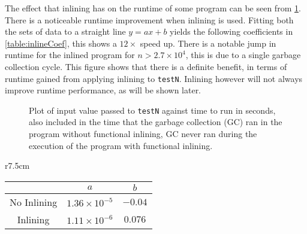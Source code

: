 \documentclass[float=false, crop=false]{standalone}
\newlength\gwidth
\newlength\gheight
\newcommand{\importMGraph}[3]{\setlength{\gwidth}{#2}\setlength{\gheight}{#3}{#1}}
\begin{document}
The effect that inlining has on the runtime of some program can be seen from
\cref{plot:inlinePlot}. 
 There is a noticeable runtime improvement when inlining is used.
Fitting both the sets of data to a straight line $y=ax+b$ yields the following
coefficients in \cref{table:inlineCoef}, this shows a $12 \times$ speed up.
  There is a notable jump in runtime for the inlined program for $n > 2.7 \times 10^{4}$, 
  this is due to a single garbage collection cycle.
  This figure shows that there is a definite benefit, 
  in terms of runtime gained from applying inlining to \texttt{testN}. Inlining however
  will not always improve runtime performance, as will be shown later. 
\begin{figure}
\begin{samepage}
  \centering
  \importMGraph{inlinePlot}{0.96\textwidth}{0.4\textwidth}
  \caption[Runtime of \texttt{testN} as a function on input size $n$]
  {Plot of input value passed to \texttt{testN} against time to run in seconds,
    also included in the time that the garbage collection (GC) ran in the program 
    without functional inlining, GC never ran during the execution of the 
    program with functional inlining.}
  \label{plot:inlinePlot}
\end{samepage}
\end{figure}

\begin{wraptable}{r}{7.5cm}
  \centering
\begin{tabular}{c | c  c}
  & $a$ & $b$\\
  \hline 
  No Inlining & $1.36\times 10^{-5}$ & $-0.04$\\
  Inlining & $1.11\times 10^{-6}$ & $0.076$
\end{tabular}
\caption{Coefficients from fitting the data in \cref{plot:inlinePlot} to 
  a straight line $y=ax+b$}
  \label{table:inlineCoef}
\end{wraptable}
\end{document}
